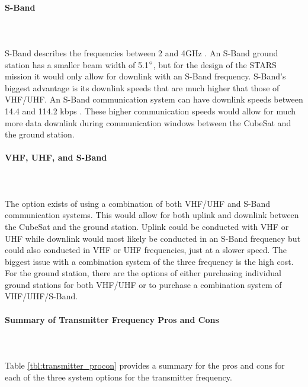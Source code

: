 \paragraph{S-Band} ~\\~\\
S-Band describes the frequencies between 2 and 4GHz \cite{ITU}. An S-Band ground station has a smaller beam width of 5.1$\degree$, but for the design of the STARS mission it would only allow for downlink with an S-Band frequency. S-Band's biggest advantage is its downlink speeds that are much higher that those of VHF/UHF. An S-Band communication system can have downlink speeds between 14.4 and 114.2 kbps \cite{isis_ground}. These higher communication speeds would allow for much more data downlink during communication windows between the CubeSat and the ground station. 

\paragraph{VHF, UHF, and S-Band} ~\\~\\
The option exists of using a combination of both VHF/UHF and S-Band communication systems. This would allow for both uplink and downlink between the CubeSat and the ground station. Uplink could be conducted with VHF or UHF while downlink would most likely be conducted in an S-Band frequency but could also conducted in VHF or UHF frequencies, just at a slower speed.  The biggest issue with a combination system of the three frequency is the high cost. For the ground station, there are the options of either purchasing individual ground stations for both VHF/UHF or to purchase a combination system of VHF/UHF/S-Band. 

\paragraph{Summary of Transmitter Frequency Pros and Cons} ~\\~\\
Table \ref{tbl:transmitter_procon} provides a summary for the pros and cons for each of the three system options for the transmitter frequency. 

